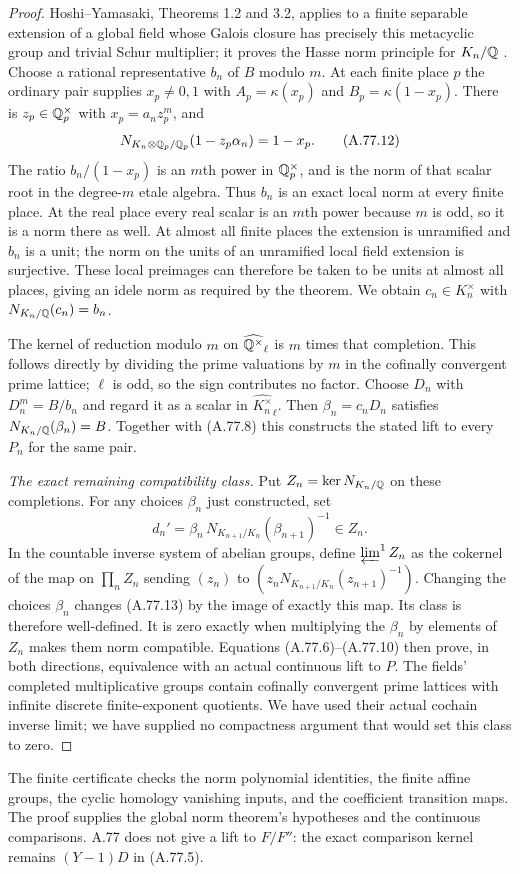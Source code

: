 \begin{proof}
Hoshi--Yamasaki, Theorems 1.2 and 3.2, applies to a finite
separable extension of a global field whose Galois closure
has precisely this metacyclic group and trivial Schur multiplier;
it proves the Hasse norm principle for $K_n/\mathbb Q$
\cite{RootHoshiYamasaki2025}.
Choose a rational representative $b_n$ of $B$ modulo $m$.
At each finite place $p$ the ordinary pair supplies
$x_p\ne0,1$ with $A_p=\kappa(x_p)$ and
$B_p=\kappa(1-x_p)$.
There is $z_p\in\mathbb Q_p^\times$ with $x_p=a_nz_p^m$, and
\[
 N_{K_n\otimes\mathbb Q_p/\mathbb Q_p}(1-z_p\alpha_n)=1-x_p.
 \tag{A.77.12}
\]
The ratio $b_n/(1-x_p)$ is an $m$th power in $\mathbb Q_p^\times$,
and is the norm of that scalar root in the degree-$m$ etale
algebra.  Thus $b_n$ is an exact local norm at every finite
place.  At the real place every real scalar is an $m$th
power because $m$ is odd, so it is a norm there as well.
At almost all finite places the extension is unramified and
$b_n$ is a unit; the norm on the units of an unramified local
field extension is surjective.  These local preimages can
therefore be taken to be units at almost all places, giving
an idele norm as required by the theorem.
We obtain $c_n\in K_n^\times$ with $N_{K_n/\mathbb Q}(c_n)=b_n$.

The kernel of reduction modulo $m$ on
$\widehat{\mathbb Q^\times}_{\ell}$ is $m$ times that completion.
This follows directly by dividing the prime valuations by
$m$ in the cofinally convergent prime lattice; $\ell$ is odd,
so the sign contributes no factor.
Choose $D_n$ with $D_n^m=B/b_n$ and regard it as a scalar
in $\widehat{K_n^\times}_{\ell}$.
Then $\beta_n=c_nD_n$ satisfies $N_{K_n/\mathbb Q}(\beta_n)=B$.
Together with (A.77.8) this constructs the stated lift to
every $P_n$ for the same pair.

\emph{The exact remaining compatibility class.}
Put $Z_n=\ker N_{K_n/\mathbb Q}$ on these completions.
For any choices $\beta_n$ just constructed, set
\[
 d_n'=\beta_n\,N_{K_{n+1}/K_n}(\beta_{n+1})^{-1}\in Z_n.
 \tag{A.77.13}
\]
In the countable inverse system of abelian groups, define
$\varprojlim^1 Z_n$ as the cokernel of the map on
$\prod_n Z_n$ sending $(z_n)$ to
$(z_nN_{K_{n+1}/K_n}(z_{n+1})^{-1})$.
Changing the choices $\beta_n$ changes (A.77.13) by the image
of exactly this map.  Its class is therefore well-defined.
It is zero exactly when multiplying the $\beta_n$ by elements
of $Z_n$ makes them norm compatible.  Equations
(A.77.6)--(A.77.10) then prove, in both directions, equivalence
with an actual continuous lift to $P$.
The fields' completed multiplicative groups contain cofinally
convergent prime lattices with infinite discrete finite-exponent
quotients.  We have used their actual cochain inverse limit;
we have supplied no compactness argument that would set this
class to zero.
\end{proof}



The finite certificate 
checks the norm polynomial identities, the finite affine groups,
the cyclic homology vanishing inputs, and the coefficient
transition maps.  The proof supplies the global norm theorem's
hypotheses and the continuous comparisons.  A.77 does not give
a lift to $F/F''$: the exact comparison kernel remains
$(Y-1)D$ in (A.77.5).
